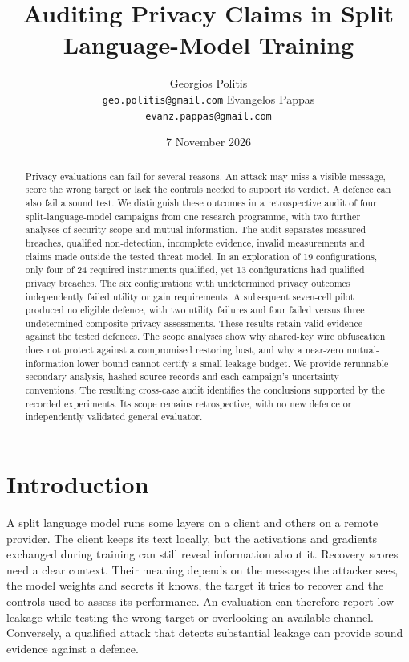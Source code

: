 \documentclass{article}
\title{Auditing Privacy Claims in Split Language-Model Training}
\author{Georgios Politis\\{\small\texttt{geo.politis@gmail.com}}
\And Evangelos Pappas\\{\small\texttt{evanz.pappas@gmail.com}}}
\date{7 November 2026}
\begin{document}
\maketitle
\begin{abstract}
Privacy evaluations can fail for several reasons. An attack may miss a
visible message, score the wrong target or lack the controls needed to
support its verdict. A defence can also fail a sound test. We distinguish
these outcomes in a retrospective audit of four split-language-model
campaigns from one research programme, with two further analyses of
security scope and mutual information. The audit separates measured
breaches, qualified non-detection, incomplete evidence, invalid
measurements and claims made outside the tested threat model. In an
exploration of 19 configurations, only four of 24 required instruments
qualified, yet 13 configurations had qualified privacy breaches.
The six configurations with undetermined privacy outcomes independently
failed utility or gain requirements. A subsequent seven-cell pilot
produced no eligible defence, with two utility failures and four failed
versus three undetermined composite privacy assessments. These results
retain valid evidence against the tested defences. The scope analyses
show why shared-key wire obfuscation does not protect against a
compromised restoring host, and why a near-zero mutual-information lower
bound cannot certify a small leakage budget. We provide rerunnable
secondary analysis, hashed source records and each campaign's uncertainty
conventions. The resulting cross-case audit identifies the conclusions
supported by the recorded experiments. Its scope remains retrospective,
with no new defence or independently validated general evaluator.
\end{abstract}

\section{Introduction}
\label{sec:intro}

A split language model runs some layers on a client and others on a
remote provider. The client keeps its text locally, but the activations
and gradients exchanged during training can still reveal information
about it. Recovery scores need a clear context. Their meaning depends on
the messages the attacker sees, the model weights and secrets it knows,
the target it tries to recover and the controls used to assess its
performance. An evaluation can therefore report low leakage while testing
the wrong target or overlooking an available channel. Conversely, a
qualified attack that detects substantial leakage can provide sound
evidence against a defence.
\end{document}

